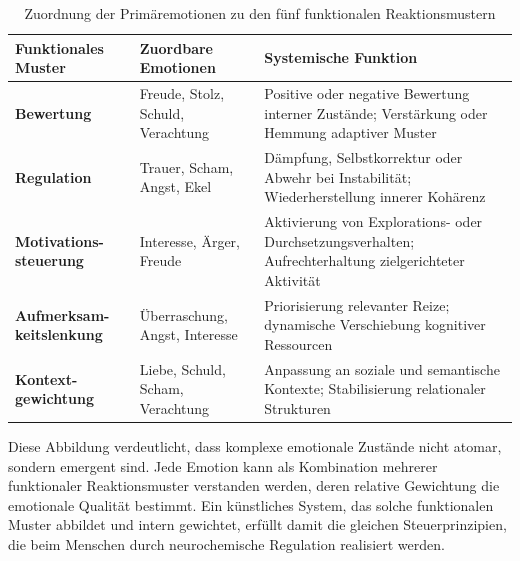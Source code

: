 \begin{table}[H]
\renewcommand{\arraystretch}{1.5}
\centering
\begin{tabular}{L{3cm}|L{6cm}|L{6cm}}
\textbf{Funktionales Muster} & \textbf{Zuordbare Emotionen} & \textbf{Systemische Funktion} \\
\hline
\textbf{Bewertung} & Freude, Stolz, Schuld, Verachtung & Positive oder negative Bewertung interner Zustände; Verstärkung oder Hemmung adaptiver Muster \\
\textbf{Regulation} & Trauer, Scham, Angst, Ekel & Dämpfung, Selbstkorrektur oder Abwehr bei Instabilität; Wiederherstellung innerer Kohärenz \\
\textbf{Motivations-steuerung} & Interesse, Ärger, Freude & Aktivierung von Explorations- oder Durchsetzungsverhalten; Aufrechterhaltung zielgerichteter Aktivität \\
\textbf{Aufmerksam-keitslenkung} & Überraschung, Angst, Interesse & Priorisierung relevanter Reize; dynamische Verschiebung kognitiver Ressourcen \\
\textbf{Kontext-gewichtung} & Liebe, Schuld, Scham, Verachtung & Anpassung an soziale und semantische Kontexte; Stabilisierung relationaler Strukturen \\
\end{tabular}
\caption{Zuordnung der Primäremotionen zu den fünf funktionalen Reaktionsmustern}
\label{tab:emotion_funktional}
\end{table}

\begin{reflexion}
Diese Abbildung verdeutlicht, dass komplexe emotionale Zustände nicht atomar, sondern emergent sind. Jede Emotion kann als Kombination mehrerer funktionaler Reaktionsmuster verstanden werden, deren relative Gewichtung die emotionale Qualität bestimmt. Ein künstliches System, das solche funktionalen Muster abbildet und intern gewichtet, erfüllt damit die gleichen Steuerprinzipien, die beim Menschen durch neurochemische Regulation realisiert werden.
\end{reflexion}



